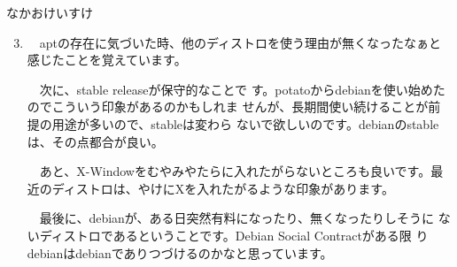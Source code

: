\begin{prework}{なかおけいすけ}
 \begin{enumerate}
  \setcounter{enumi}{2}
  \item 　aptの存在に気づいた時、他のディストロを使う理由が無くなったなぁと
        感じたことを覚えています。
        
        　次に、stable releaseが保守的なことで
        す。potatoからdebianを使い始めたのでこういう印象があるのかもしれま
        せんが、長期間使い続けることが前提の用途が多いので、stableは変わら
        ないで欲しいのです。debianのstableは、その点都合が良い。
        
        　あと、X-Windowをむやみやたらに入れたがらないところも良いです。最
        近のディストロは、やけにXを入れたがるような印象があります。
        
        　最後に、debianが、ある日突然有料になったり、無くなったりしそうに
        ないディストロであるということです。Debian Social Contractがある限
        りdebianはdebianでありつづけるのかなと思っています。
 \end{enumerate}
\end{prework}
